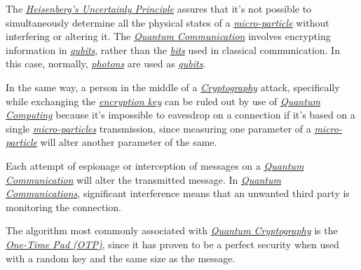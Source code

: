 \documentclass[conference]{IEEEtran}
\begin{document}
\vspace{4pt}

The \href{https://en.wikipedia.org/wiki/Uncertainty_principle}{\textit{Heisenberg's Uncertainly Principle}} assures that it's not possible to simultaneously determine all the physical states of a \href{https://en.wikipedia.org/wiki/Microparticle}{\textit{micro-particle}} without interfering or altering it. The \href{https://en.wikipedia.org/wiki/Quantum_information_science}{\textit{Quantum Communication}} involves encrypting information in \href{https://en.wikipedia.org/wiki/Qubit}{\textit{qubits}}, rather than the \href{https://en.wikipedia.org/wiki/Bit}{\textit{bits}} used in classical communication. In this case, normally, \href{https://en.wikipedia.org/wiki/Photon}{\textit{photons}} are used as \href{https://en.wikipedia.org/wiki/Qubit}{\textit{qubits}}.

\vspace{4pt}

In the same way, a person in the middle of a \href{https://en.wikipedia.org/wiki/Cryptography}{\textit{Cryptography}} attack, specifically while exchanging the \href{https://en.wikipedia.org/wiki/Key_(cryptography)}{\textit{encryption key}} can be ruled out by use of \href{https://en.wikipedia.org/wiki/Quantum_computing}{\textit{Quantum Computing}} because it's impossible to eavesdrop on a connection if it's based on a single \href{https://en.wikipedia.org/wiki/Microparticle}{\textit{micro-particles}} transmission, since measuring one parameter of a \href{https://en.wikipedia.org/wiki/Microparticle}{\textit{micro-particle}} will alter another parameter of the same.

\vspace{4pt}

Each attempt of espionage or interception of messages on a \href{https://en.wikipedia.org/wiki/Quantum_information_science}{\textit{Quantum Communication}} will alter the transmitted message. In \href{https://en.wikipedia.org/wiki/Quantum_information_science}{\textit{Quantum Communications}}, significant interference means that an unwanted third party is monitoring the connection.

\vspace{4pt}

The algorithm most commonly associated with \href{https://en.wikipedia.org/wiki/Quantum_cryptography}{\textit{Quantum Cryptography}} is the \href{https://en.wikipedia.org/wiki/One-time_pad}{\textit{One-Time Pad (OTP)}}, since it has proven to be a perfect security when used with a random key and the same size as the message.
\end{document}

